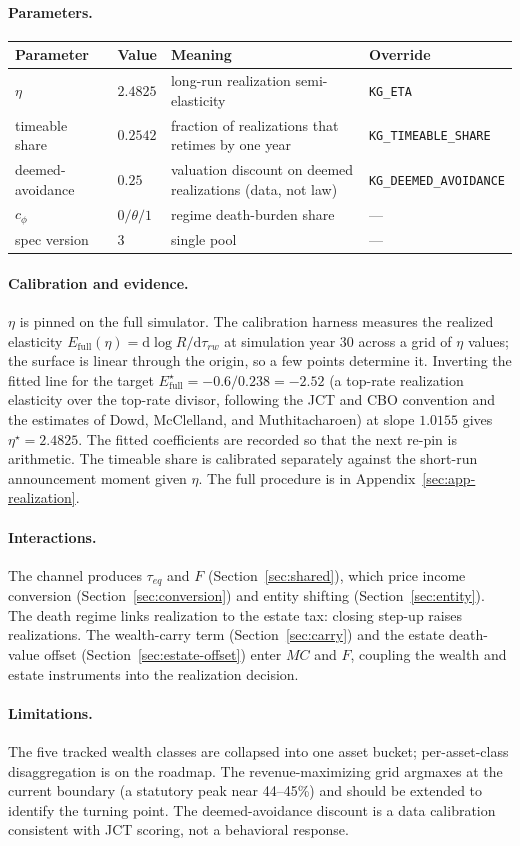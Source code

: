 \documentclass[11pt]{article}
\newcommand{\code}[1]{\texttt{\small #1}}
\newcommand{\field}[1]{\paragraph{#1.}}
\begin{document}
\field{Parameters}
\begin{table}[h]
\centering\small
\begin{tabular}{@{}llp{}l@{}}
\toprule
Parameter & Value & Meaning & Override \\
\midrule
$\eta$ & $2.4825$ & long-run realization semi-elasticity & \code{KG_ETA} \\
timeable share & $0.2542$ & fraction of realizations that retimes by one year & \code{KG_TIMEABLE_SHARE} \\
deemed-avoidance & $0.25$ & valuation discount on deemed realizations (data, not law) & \code{KG_DEEMED_AVOIDANCE} \\
$c_\phi$ & $0/\theta/1$ & regime death-burden share & --- \\
spec version & $3$ & single pool & --- \\
\bottomrule
\end{tabular}
\end{table}

\field{Calibration and evidence}
$\eta$ is pinned on the full simulator. The calibration harness measures the
realized elasticity $E_{\text{full}}(\eta)=\mathrm{d}\log R/\mathrm{d}\tau_{rw}$
at simulation year 30 across a grid of $\eta$ values; the surface is linear
through the origin, so a few points determine it. Inverting the fitted line for
the target $E_{\text{full}}^{\star}=-0.6/0.238=-2.52$ (a top-rate realization
elasticity over the top-rate divisor, following the JCT and CBO convention and
the estimates of Dowd, McClelland, and Muthitacharoen) at slope $1.0155$ gives
$\eta^{\star}=2.4825$. The fitted coefficients are recorded so that the next
re-pin is arithmetic. The timeable share is calibrated separately against the
short-run announcement moment given $\eta$. The full procedure is in
Appendix~\ref{sec:app-realization}.

\field{Interactions}
The channel produces $\tau_{eq}$ and $F$ (Section~\ref{sec:shared}), which price
income conversion (Section~\ref{sec:conversion}) and entity shifting
(Section~\ref{sec:entity}). The death regime links realization to the estate
tax: closing step-up raises realizations. The wealth-carry term
(Section~\ref{sec:carry}) and the estate death-value offset
(Section~\ref{sec:estate-offset}) enter $MC$ and $F$, coupling the wealth and
estate instruments into the realization decision.

\field{Limitations}
The five tracked wealth classes are collapsed into one asset bucket;
per-asset-class disaggregation is on the roadmap. The revenue-maximizing grid
argmaxes at the current boundary (a statutory peak near 44--45\%) and should be
extended to identify the turning point. The deemed-avoidance discount is a
data calibration consistent with JCT scoring, not a behavioral response.
\end{document}
